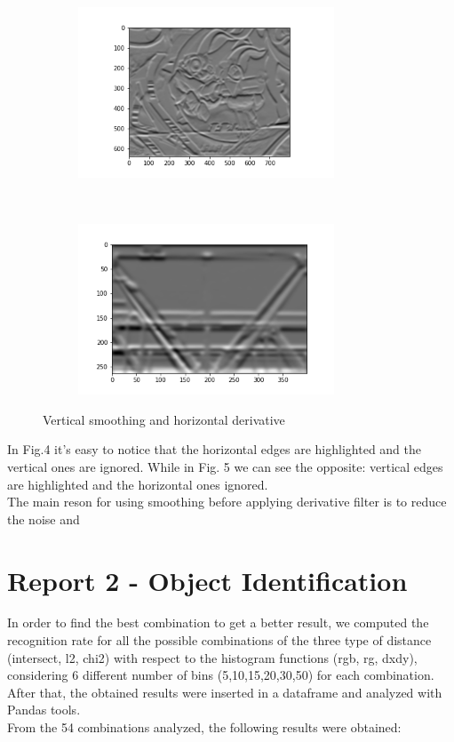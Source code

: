 \documentclass[
	12pt, %
]{fphw}
\begin{document}
\begin{figure}[h!]
    \centering
    \begin{subfigure}[t]{0.5\textwidth}
        \centering
        \includegraphics[height=2in]{img/1e/graf2.png}

    \end{subfigure}%
    ~ 
    \begin{subfigure}[t]{0.4\textwidth}
        \centering
        \includegraphics[height=2in]{img/1e/gantry2.png}

	\end{subfigure}
	\caption{Vertical smoothing and horizontal derivative}
\end{figure}


In Fig.4 it's easy to notice that the horizontal edges are highlighted and the vertical ones are ignored. While in Fig. 5 we can see the opposite: vertical edges are highlighted and the horizontal ones ignored. \\
The main reson for using smoothing before applying derivative filter is to reduce the noise and 





\newpage
\section*{Report 2 - Object Identification}


In order to find the best combination to get a better result, we computed the recognition rate for all the possible combinations of the three type of distance (intersect, l2, chi2) with respect to the histogram functions (rgb, rg, dxdy), considering 6 different number of bins (5,10,15,20,30,50) for each combination. After that, the obtained results were inserted in a dataframe and analyzed with Pandas tools. \\
From the 54 combinations analyzed, the following results were obtained:\\ \\
\end{document}
